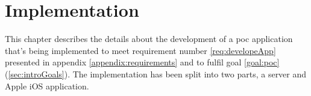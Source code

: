 \chapter{Implementation}\label{sec:impl}
This chapter describes the details about the development of a \acrshort{poc} application that's being implemented to meet requirement number \ref{req:developeApp} presented in appendix \ref{appendix:requirements} and to fulfil goal \ref{goal:poc} (\cref{sec:introGoals}).
The implementation has been split into two parts, a server and Apple iOS application.




